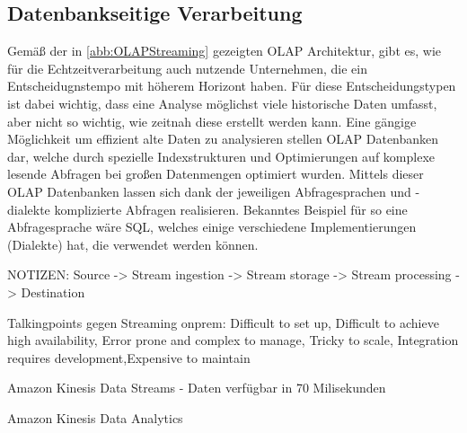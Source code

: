 
\subsection{Datenbankseitige Verarbeitung}

Gemäß der in \autoref{abb:OLAPStreaming} gezeigten \ac{OLAP} Architektur, gibt es, wie für die Echtzeitverarbeitung auch nutzende Unternehmen, die ein Entscheidugnstempo mit höherem Horizont haben. Für diese Entscheidungstypen ist dabei wichtig, dass eine Analyse möglichst viele historische Daten umfasst, aber nicht so wichtig, wie zeitnah diese erstellt werden kann. Eine gängige Möglichkeit um effizient alte Daten zu analysieren stellen \ac{OLAP} Datenbanken dar, welche durch spezielle Indexstrukturen und Optimierungen auf komplexe lesende Abfragen bei großen Datenmengen optimiert wurden.  Mittels dieser \ac{OLAP} Datenbanken lassen sich dank der jeweiligen Abfragesprachen und -dialekte komplizierte Abfragen realisieren. Bekanntes Beispiel für so eine Abfragesprache wäre \ac{SQL}, welches einige verschiedene Implementierungen (Dialekte) hat, die verwendet werden können. 


NOTIZEN:
Source -> Stream ingestion -> Stream storage -> Stream processing -> Destination

Talkingpoints gegen Streaming onprem:
Difficult to set up, Difficult to achieve high availability,
Error prone and complex to manage,
Tricky to scale, Integration requires development,Expensive to maintain

Amazon Kinesis Data Streams - Daten verfügbar in 70 Milisekunden

Amazon Kinesis Data Analytics